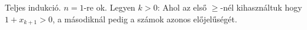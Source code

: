 Teljes indukció.
\newline
$n=1$-re ok. Legyen $k>0$:
Ahol az első $\ge$-nél kihasználtuk hogy $1+x_{k+1}>0$, a másodiknál pedig a számok azonos
előjelűségét.
